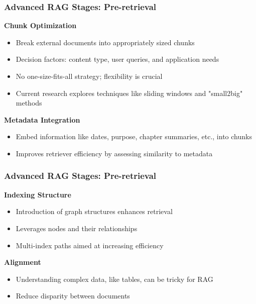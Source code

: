 \begin{frame}[fragile]\frametitle{Advanced RAG Stages: Pre-retrieval}
\textbf{Chunk Optimization}

  \begin{itemize}
    \item Break external documents into appropriately sized chunks
    \item Decision factors: content type, user queries, and application needs
    \item No one-size-fits-all strategy; flexibility is crucial
    \item Current research explores techniques like sliding windows and "small2big" methods
  \end{itemize}
  
\textbf{Metadata Integration}

  \begin{itemize}
    \item Embed information like dates, purpose, chapter summaries, etc., into chunks
    \item Improves retriever efficiency by assessing similarity to metadata
  \end{itemize}
  

\end{frame}

\begin{frame}[fragile]\frametitle{Advanced RAG Stages: Pre-retrieval}
\textbf{Indexing Structure}
  \begin{itemize}
    \item Introduction of graph structures enhances retrieval
    \item Leverages nodes and their relationships
    \item Multi-index paths aimed at increasing efficiency
  \end{itemize}
  
\textbf{Alignment}
  \begin{itemize}
    \item Understanding complex data, like tables, can be tricky for RAG
    \item Reduce disparity between documents
  \end{itemize}
\end{frame}

